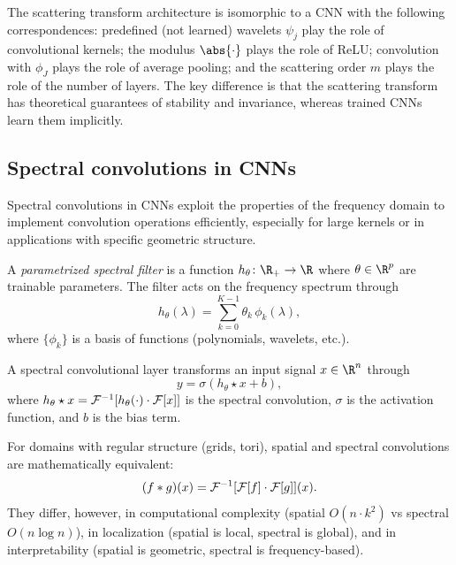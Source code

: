 \begin{remark}
\label{rem:grids:scattering-cnn}
The scattering transform architecture is isomorphic to a CNN with the following
correspondences: predefined (not learned) wavelets $\psi_j$ play the role of
convolutional kernels; the modulus $\abs{\cdot}$ plays the role of ReLU;
convolution with $\phi_J$ plays the role of average pooling; and the scattering
order $m$ plays the role of the number of layers. The key difference is that the
scattering transform has theoretical guarantees of stability and invariance,
whereas trained CNNs learn them implicitly.
\end{remark}

\subsection{Spectral convolutions in CNNs}
\label{sec:grids:spectral-cnns}

Spectral convolutions in CNNs exploit the properties of the frequency domain to
implement convolution operations efficiently, especially for large kernels or in
applications with specific geometric structure.

\begin{definition}
\label{def:grids:spectral-filter}
A \emph{parametrized spectral filter} is a function
$h_\theta \colon \R_+ \to \R$ where $\theta \in \R^p$ are trainable parameters.
The filter acts on the frequency spectrum through
\[
  h_\theta(\lambda) = \sum_{k=0}^{K-1} \theta_k\, \phi_k(\lambda),
\]
where $\{\phi_k\}$ is a basis of functions (polynomials, wavelets, etc.).
\end{definition}

\begin{definition}
\label{def:grids:spectral-layer}
A spectral convolutional layer transforms an input signal $x \in \R^n$ through
\[
  y = \sigma(h_\theta \star x + b),
\]
where $h_\theta \star x = \mathcal{F}^{-1}[h_\theta(\cdot) \cdot \mathcal{F}[x]]$ is the
spectral convolution, $\sigma$ is the activation function, and $b$ is the bias
term.
\end{definition}

\begin{theorem}
\label{thm:grids:spatial-spectral}
For domains with regular structure (grids, tori), spatial and spectral
convolutions are mathematically equivalent:
\[
  (f * g)(x) = \mathcal{F}^{-1}[\mathcal{F}[f] \cdot \mathcal{F}[g]](x).
\]
They differ, however, in computational complexity (spatial $O(n \cdot k^2)$ vs
spectral $O(n \log n)$), in localization (spatial is local, spectral is global),
and in interpretability (spatial is geometric, spectral is frequency-based).
\end{theorem}

